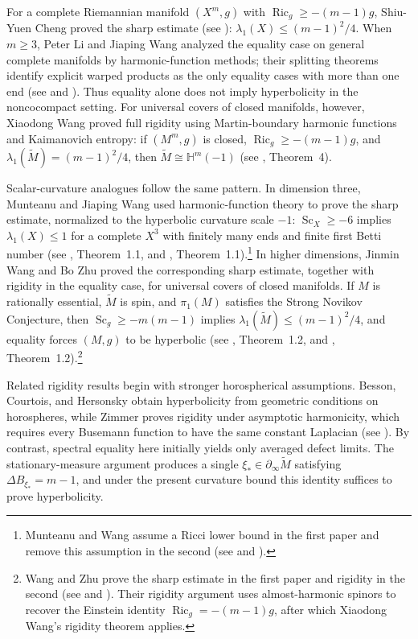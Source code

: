 \documentclass[12pt]{amsart}
\theoremstyle{definition}
\numberwithin{equation}{section}
\newcommand{\wti}{\widetilde}
\newcommand{\bH}{\mathbb{H}}
\DeclareMathOperator{\Ric}{Ric}
\begin{document}
For a complete Riemannian manifold \((X^m,g)\) with
\(\Ric_g\geq-(m-1)g\), Shiu-Yuen Cheng proved the sharp estimate
(see \cite{Cheng1975}):
\(\lambda_1(X)\leq (m-1)^2/4\). When $m\geq 3$,
Peter Li and Jiaping Wang analyzed the equality
case on general complete manifolds by harmonic-function methods; their
splitting theorems identify explicit warped products as the only equality
cases with more than one end (see \cite{LiWang2001} and
\cite{LiWang2002}).  Thus equality alone does not imply hyperbolicity in
the noncocompact setting.  For universal covers of closed manifolds,
however, Xiaodong Wang proved full rigidity using Martin-boundary harmonic
functions and Kaimanovich entropy: if \((M^m,g)\) is closed,
\(\Ric_g\geq-(m-1)g\), and
\(\lambda_1(\wti M)=(m-1)^2/4\), then
\(\wti M\cong\bH^m(-1)\)
(see \cite{Wang2008}, Theorem~4).

Scalar-curvature analogues follow the same pattern.  In dimension three,
Munteanu and Jiaping Wang used harmonic-function theory to prove the sharp
estimate, normalized to the hyperbolic curvature scale \(-1\):
\(\operatorname{Sc}_X\geq-6\) implies \(\lambda_1(X)\leq 1\)
for a complete \(X^3\) with finitely many ends and finite first Betti
number (see \cite{MunteanuWang2024}, Theorem~1.1, and
\cite{MunteanuWang2026}, Theorem~1.1).\footnote{Munteanu and Wang assume a
Ricci lower bound in the first paper and remove this assumption in the
second (see \cite{MunteanuWang2024} and \cite{MunteanuWang2026}).} In
higher dimensions, Jinmin Wang and Bo Zhu proved the corresponding
sharp estimate, together with rigidity in the equality case, for universal
covers of closed manifolds.  If
\(M\) is rationally essential, \(\wti M\) is spin, and \(\pi_1(M)\)
satisfies the Strong Novikov Conjecture, then
\(\operatorname{Sc}_g\geq-m(m-1)\) implies
\(\lambda_1(\wti M)\leq(m-1)^2/4\), and equality forces
\((M,g)\) to be hyperbolic
(see \cite{WangZhu2024}, Theorem~1.2, and
\cite{WangZhu2026}, Theorem~1.2).\footnote{Wang and Zhu prove the sharp
estimate in the first paper and rigidity in the second
(see \cite{WangZhu2024} and \cite{WangZhu2026}).  Their rigidity argument
uses almost-harmonic spinors to
recover the Einstein identity
\(\Ric_g=-(m-1)g\), after which Xiaodong Wang's rigidity theorem applies.}

Related rigidity results begin with stronger horospherical assumptions.
Besson, Courtois, and Hersonsky obtain hyperbolicity from geometric
conditions on horospheres, while Zimmer proves rigidity under asymptotic
harmonicity, which requires every Busemann function to have the same
constant Laplacian (see
\cites{BessonCourtoisHersonsky2025Flat,
BessonCourtoisHersonsky2025Horospherical,Zimmer2012}).  By contrast,
spectral equality here initially yields only averaged defect limits.  The
stationary-measure argument produces a single
\(\xi_*\in\partial_\infty\wti M\) satisfying
\(\Delta B_{\xi_*}=m-1\), and under the present curvature bound this
identity suffices to prove hyperbolicity.
\end{document}
